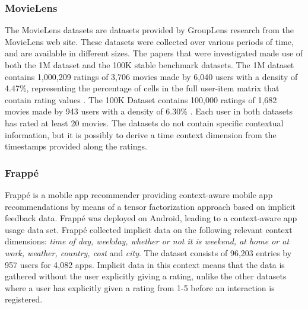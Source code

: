 \subsubsection{MovieLens}
The MovieLens datasets are datasets provided by GroupLens research from the MovieLens web site.
These datasets were collected over various periods of time, and are available in different sizes\cite{movielens}.
The papers that were investigated made use of both the 1M dataset and the 100K stable benchmark datasets.
The 1M dataset contains 1,000,209 ratings of 3,706 movies made by 6,040 users with a density of 4.47\%, representing the percentage of cells in the full user-item matrix that contain rating values \cite{MovieLens2015}.
The 100K Dataset contains 100,000 ratings of 1,682 movies made by 943 users with a density of 6.30\% \cite{MovieLens2015}.
Each user in both datasets has rated at least 20 movies.
The datasets do not contain specific contextual information, but it is possibly to derive a time context dimension from the timestamps provided along the ratings.

\subsubsection{Frappé}
Frappé is a mobile app recommender providing context-aware mobile app recommendations by means of a tensor factorization approach based on implicit feedback data\cite{baltrunas2015frappe}.
Frappé was deployed on Android, leading to a context-aware app usage data set.
Frappé collected implicit data on the following relevant context dimensions: \textit{time of day, weekday, whether or not it is weekend, at home or at work, weather, country, cost} and \textit{city}. 
The dataset consists of 96,203 entries by 957 users for 4,082 apps.
Implicit data in this context means that the data is gathered without the user explicitly giving a rating, unlike the other datasets where a user has explicitly given a rating from 1-5 before an interaction is registered.

